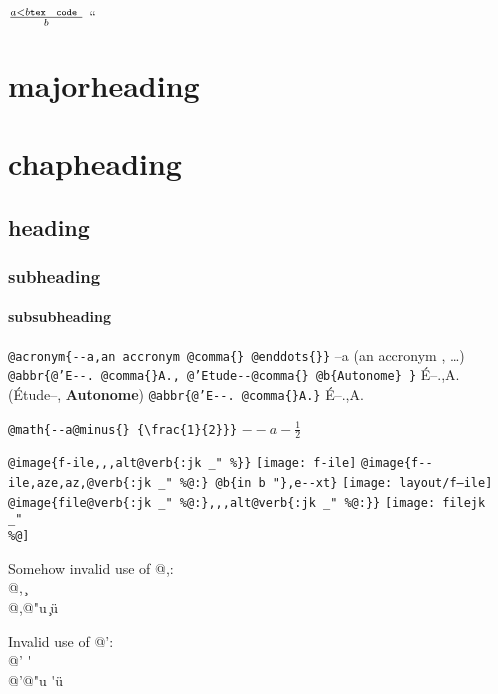 \documentclass{book}
\newcommand{\GNUTexinfoplaceholder}[1]{}
\newcommand{\GNUTexinfonopagebreakheading}[2]{\let\clearpage\relax \let\cleardoublepage\relax \let\thispagestyle\GNUTexinfoplaceholder #1{#2}}
\renewcommand{\includegraphics}[1]{\fbox{FIG #1}}
\begin{document}
$\frac{a < b \texttt{tex \hbox{ code }}}{b}$ ``

\GNUTexinfonopagebreakheading{\chapter*}{majorheading}

\GNUTexinfonopagebreakheading{\chapter*}{chapheading}

\GNUTexinfonopagebreakheading{\section*}{heading}

\GNUTexinfonopagebreakheading{\subsection*}{subheading}

\GNUTexinfonopagebreakheading{\subsubsection*}{subsubheading}


\texttt{@acronym\{{-}{-}a,an accronym @comma\{\} @enddots\{\}\}} --a (an accronym , \dots{})
\texttt{@abbr\{@'E{-}{-}. @comma\{\}A., @'Etude{-}{-}@comma\{\} @b\{Autonome\} \}} \'{E}--.\@ ,A.\@ (\'{E}tude--, \textbf{Autonome})
\texttt{@abbr\{@'E{-}{-}. @comma\{\}A.\}} \'{E}--.\@ ,A.\@

\texttt{@math\{{-}{-}a@minus\{\} \{\textbackslash{}frac\{1\}\{2\}\}\}} $--a- {\frac{1}{2}}$

\texttt{@image\{f-ile,,,alt@verb\{:jk \_" \%\@\}\}} \texttt{[image: f-ile]}
\texttt{@image\{f{-}{-}ile,aze,az,@verb\{:jk \_" \%@:\} @b\{in b "\},e{-}{-}xt\}} \texttt{[image: layout/f--ile]}
\texttt{@image\{file@verb\{:jk \_" \%@:\},,,alt@verb\{:jk \_" \%@:\}\}} \texttt{[image: filejk \\\_" \\\%@]}




Somehow invalid use of @,:\leavevmode{}\\
@, \c{}
\leavevmode{}\\
@,@"u \c{}\"{u}

Invalid use of @':\leavevmode{}\\
@' \'{}
\leavevmode{}\\
@'@"u \'{}\"{u}
\end{document}
